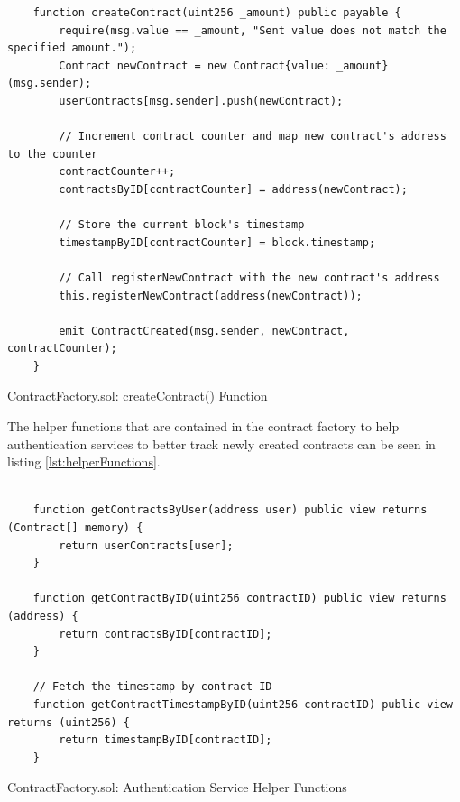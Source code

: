 



\lstset{
  basicstyle=\footnotesize\ttfamily,
  breaklines=true,
  numbers=left,
  firstnumber=39,
}

\begin{Listing}[H]
\begin{lstlisting}
    function createContract(uint256 _amount) public payable {
        require(msg.value == _amount, "Sent value does not match the specified amount.");
        Contract newContract = new Contract{value: _amount}(msg.sender);
        userContracts[msg.sender].push(newContract);

        // Increment contract counter and map new contract's address to the counter
        contractCounter++;
        contractsByID[contractCounter] = address(newContract);
        
        // Store the current block's timestamp
        timestampByID[contractCounter] = block.timestamp;

        // Call registerNewContract with the new contract's address
        this.registerNewContract(address(newContract));

        emit ContractCreated(msg.sender, newContract, contractCounter);
    }
\end{lstlisting}
  \caption{ContractFactory.sol: createContract() Function}
  \label{lst:createContract}
\end{Listing}



The helper functions that are contained in the contract factory to help authentication services to better track newly created contracts can be seen in listing \ref{lst:helperFunctions}.

\lstset{
  basicstyle=\footnotesize\ttfamily,
  breaklines=true,
  numbers=left,
  firstnumber=57
}

\begin{Listing}[H]
\begin{lstlisting}

    function getContractsByUser(address user) public view returns (Contract[] memory) {
        return userContracts[user];
    }

    function getContractByID(uint256 contractID) public view returns (address) {
        return contractsByID[contractID];
    }

    // Fetch the timestamp by contract ID
    function getContractTimestampByID(uint256 contractID) public view returns (uint256) {
        return timestampByID[contractID];
    }

\end{lstlisting}
  \caption{ContractFactory.sol: Authentication Service Helper Functions}
  \label{lst:helperFunctions}
\end{Listing}





